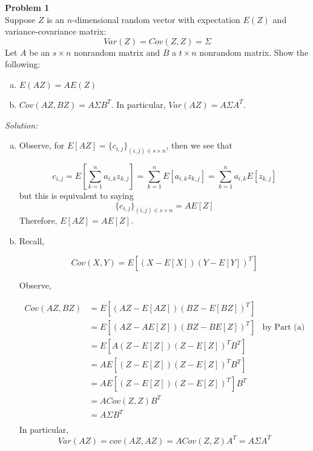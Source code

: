 \documentclass{article}
\newenvironment{problem}[2][Problem]
    { \begin{mdframed}[backgroundcolor=gray!20] \textbf{#1 #2} \\}
    {  \end{mdframed}}
\newenvironment{solution}
    {\textit{Solution:}}
    {}
\begin{document}
\begin{problem}{1}
Suppose $Z$ is an $n$-dimensional random vector with expectation $E(Z)$ and variance-covariance
matrix:
$$Var(Z) = Cov(Z,Z) = \Sigma$$
Let $A$ be an $s \times n$ nonrandom matrix and $B$ a $t \times n$ nonrandom matrix. Show the following:
\begin{enumerate}[(a)]
\item $E(AZ) = AE(Z)$
\item $Cov(AZ,BZ) = A\Sigma B^T$. In particular, $Var(AZ) = A\Sigma A^T .$
\end{enumerate}
\end{problem}
\begin{solution}
\begin{enumerate}[(a)]
\item Observe, for $E[AZ] = \{ c_{i,j} \}_{(i,j) \in s \times n}$, then we see that 

$$c_{i,j} = E\left [\sum_{k = 1}^n a_{i,k} z_{k, j} \right] = \sum_{k = 1}^n E\left [a_{i,k} z_{k, j} \right] = \sum_{k = 1}^n a_{i,k} E\left [z_{k, j} \right]$$
but this is equivalent to saying 
$$\{ c_{i,j} \}_{(i,j) \in s \times n} = A E[Z]$$
Therefore, $E[AZ] = A E[Z]$.
\item Recall, 

$$Cov(X,Y) = E[(X - E[X])(Y - E[Y])^T]$$

Observe, 

\begin{align*}
Cov(AZ,BZ) &= E[(AZ - E[AZ])(BZ - E[BZ])^T] \\
&= E[(AZ - AE[Z])(BZ - BE[Z])^T] & \text{by Part (a)} \\
&=  E[A(Z - E[Z])(Z - E[Z])^T B^T] \\
&= A E[(Z - E[Z])(Z - E[Z])^T B^T] \\
&= A E[(Z - E[Z])(Z - E[Z])^T ]B^T \\
&= A Cov(Z,Z) B^T \\
&= A \Sigma B^T \\
\end{align*}
In particular, 
$$Var(AZ) = cov(AZ,AZ) = A Cov(Z,Z) A^T =  A \Sigma A^T$$
\end{enumerate}
\end{solution}
\end{document}
